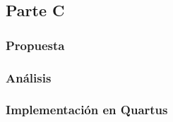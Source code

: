 \documentclass[../procedimientos.tex]{subfiles}
\begin{document}
\clearpage
\subsection{Parte C}
\subsubsection{Propuesta}

\subsubsection{Análisis}

\subsubsection{Implementación en Quartus}
\end{document}
